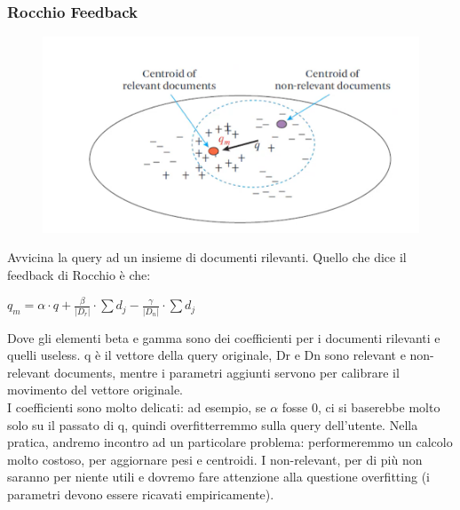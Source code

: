 \subsubsection{Rocchio Feedback}
\begin{figure}[th]
    \centering
    \includegraphics[scale=0.4]{Text Analysis/img/rocchio.png}
\end{figure}
Avvicina la query ad un insieme di documenti rilevanti. Quello che dice il feedback di Rocchio è che: 
\begin{center}
    \begin{math}
        q_m = \alpha \cdot  q + \frac{\beta}{|D_r|} \cdot  \sum d_j - \frac{\gamma}{|D_n|} \cdot  \sum d_j
    \end{math}
\end{center}
Dove gli elementi beta e gamma sono dei coefficienti per i documenti rilevanti e quelli useless. q è il vettore della query originale, Dr e Dn sono relevant e non-relevant documents, mentre i parametri aggiunti servono per calibrare il movimento del vettore originale. 
\\
I coefficienti sono molto delicati: ad esempio, se $\alpha$ fosse 0, ci si baserebbe molto solo su il passato di q, quindi overfitterremmo sulla query dell'utente. Nella pratica, andremo incontro ad un particolare problema: performeremmo un calcolo molto costoso, per aggiornare pesi e centroidi. I non-relevant, per di più non saranno per niente utili e dovremo fare attenzione alla questione overfitting (i parametri devono essere ricavati empiricamente).

\newpage

